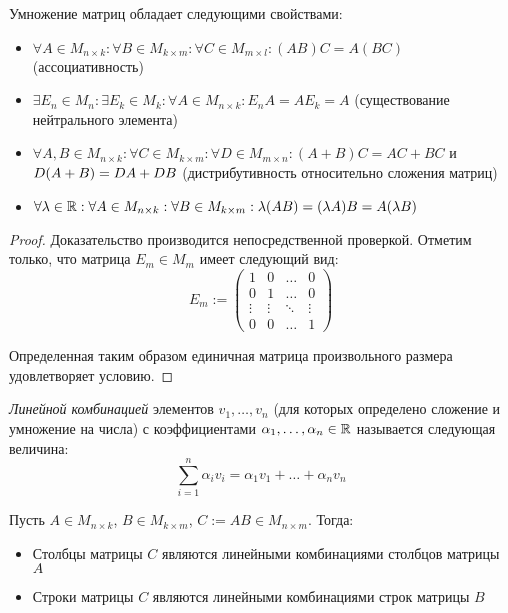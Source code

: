 \begin{proposition}
	Умножение матриц обладает следующими свойствами:
	
	\begin{itemize}
		\item $\forall A \in M_{n \times k}: \forall B \in M_{k \times m}: \forall C \in M_{m \times l}: (AB)C = A(BC)$ (ассоциативность)
		\item $\exists E_n \in  M_{n}: \exists E_k \in M_{k}: \forall A \in M_{n \times k} : E_nA = AE_k = A$ (существование нейтрального элемента)
		\item $\forall A, B \in M_{n \times k}: \forall C \in M_{k \times m}: \forall D \in M_{m \times n}: (A+B)C = AC + BC$ и $D(A+B) \hm= DA + DB$ (дистрибутивность относительно сложения матриц)
		\item $\forall \lambda \in \mathbb{R}: \forall A \in M_{n \times k}: \forall B \in M_{k \times m}: \lambda (AB) = (\lambda A)B = A(\lambda B)$
	\end{itemize}
\end{proposition}

\begin{proof}
	Доказательство производится непосредственной проверкой. Отметим только, что матрица $E_m \in M_m$ имеет следующий вид:
	\[E_m := \begin{pmatrix}
	1 & 0 & \dots & 0\\
	0 & 1 & \dots & 0\\
	\vdots & \vdots & \ddots & \vdots\\
	0 & 0 & \dots & 1
	\end{pmatrix}\]
	
	Определенная таким образом единичная матрица произвольного размера удовлетворяет условию.
\end{proof}

\begin{definition}
	\textit{Линейной комбинацией} элементов $v_1, \dots, v_n$ (для которых определено сложение и умножение на числа) с коэффициентами $\alpha_1, \dots, \alpha_n \in \mathbb{R}$ называется следующая величина:
	\[\sum_{i = 1}^{n}\alpha_iv_i = \alpha_1v_1 + \dots + \alpha_nv_n\]
\end{definition}

\begin{proposition}
	Пусть $A \in M_{n \times k}$, $B \in M_{k \times m}$, $C := AB \in M_{n \times m}$. Тогда:
	\begin{itemize}
		\item Столбцы матрицы $C$ являются линейными комбинациями столбцов матрицы $A$
		\item Строки матрицы $C$ являются линейными комбинациями строк матрицы $B$
	\end{itemize}
\end{proposition}

